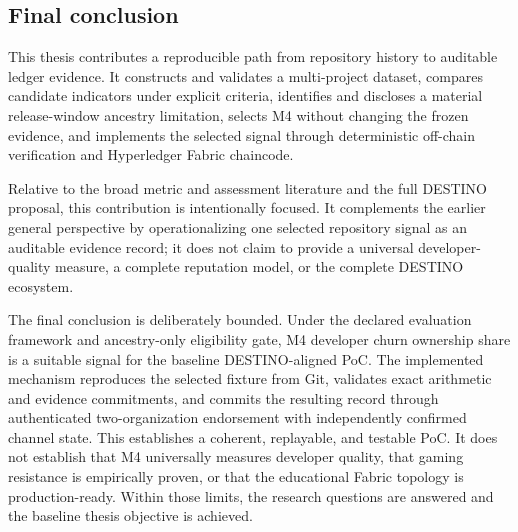 \subsection{Final conclusion}
\label{sec:final_conclusion}

This thesis contributes a reproducible path from repository history to auditable ledger evidence. It constructs and validates
a multi-project dataset, compares candidate indicators under explicit criteria, identifies and discloses a material
release-window ancestry limitation, selects M4 without changing the frozen evidence, and implements the selected signal through deterministic
off-chain verification and Hyperledger Fabric chaincode.

Relative to the broad metric and assessment literature and the full DESTINO proposal, this contribution is intentionally
focused. It complements the earlier general perspective by operationalizing one selected repository signal as an auditable
evidence record; it does not claim to provide a universal developer-quality measure, a complete reputation model, or the
complete DESTINO ecosystem.

The final conclusion is deliberately bounded. Under the declared evaluation framework and ancestry-only eligibility gate,
M4 developer churn ownership share is a suitable signal for the baseline DESTINO-aligned PoC. The implemented mechanism
reproduces the selected fixture from Git, validates exact arithmetic and evidence commitments, and commits the resulting record
through authenticated two-organization endorsement with independently confirmed channel state. This establishes a coherent,
replayable, and testable PoC. It does not establish that M4 universally measures developer quality, that gaming resistance is
empirically proven, or that the educational Fabric topology is production-ready. Within those limits, the research questions
are answered and the baseline thesis objective is achieved.
